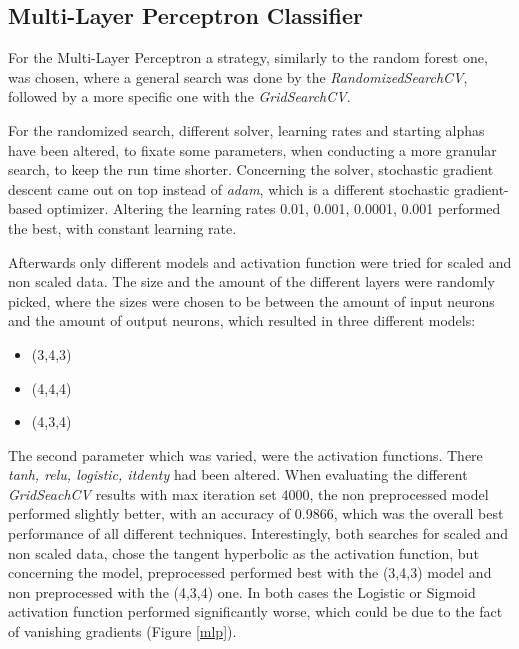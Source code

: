 
\subsection{Multi-Layer Perceptron Classifier}
For the Multi-Layer Perceptron a strategy, similarly to the random forest one,  was chosen, where a general search was done by the \textit{RandomizedSearchCV}, followed by a more specific one with the \textit{GridSearchCV}.

For the randomized search, different solver, learning rates and starting alphas have been altered, to fixate some parameters, when conducting a more granular search, to keep the run time shorter. Concerning the solver, stochastic gradient descent came out on top instead of \textit{adam}, which is a different stochastic gradient-based optimizer. Altering the learning rates 0.01, 0.001, 0.0001, 0.001 performed the best, with constant learning rate.

Afterwards only different models and activation function were tried for scaled and non scaled data. The size and the amount of the different layers were randomly picked, where the sizes were chosen to be between the amount of input neurons and the amount of output neurons, which resulted in three different models:

\begin{itemize}
\item (3,4,3)
\item (4,4,4)
\item (4,3,4)
\end{itemize}

The second parameter which was varied, were the activation functions. There \textit{tanh, relu, logistic, itdenty} had been altered. When evaluating the different \textit{GridSeachCV} results with max iteration set 4000, the non preprocessed model performed slightly better, with an accuracy of 0.9866, which was the overall best performance of all different techniques. Interestingly, both searches for scaled and non scaled data, chose the tangent hyperbolic as the activation function, but concerning the model, preprocessed performed best with the (3,4,3) model and non preprocessed with the (4,3,4) one. In both cases the Logistic or Sigmoid activation function performed significantly worse, which could be due to the fact of vanishing gradients (Figure \ref{mlp}).

